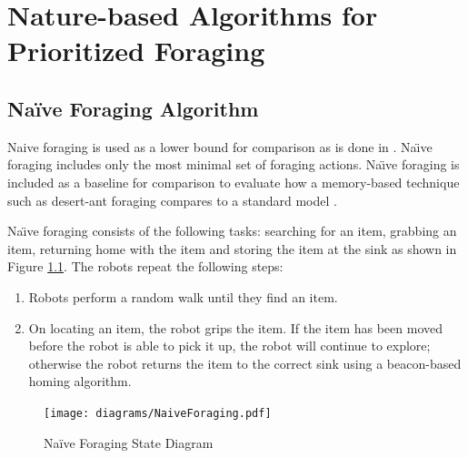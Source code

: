 
\chapter{Nature-based Algorithms for Prioritized Foraging}
\label{chap:third}




\section{Na\"ive Foraging Algorithm}


Naive foraging is used as a lower bound for comparison as is done in \cite{62} \cite{63}. Na\"\i ve foraging includes only the most minimal set of foraging actions. Na\"\i ve foraging is included as a baseline for comparison to evaluate how a memory-based technique such as desert-ant foraging compares to a standard model \cite{ostergaard2001emergent,hoff2010two}.

 Na\"\i ve foraging consists of the following tasks: searching for an item, grabbing an item, returning home with the item and storing the item at the sink as shown in Figure \ref{naiveforagestate}. The robots repeat the following steps: 

\begin{enumerate}
	\item Robots perform a random walk until they find an item.
	\item On locating an item, the robot grips the item. If the item has been moved before the robot is able to pick it up, the robot will continue to explore; otherwise the robot returns the item to the correct sink using a beacon-based homing algorithm.
\end{enumerate}
\begin{figure}
	\centering
	\texttt{[image: diagrams/NaiveForaging.pdf]}
	\caption{Na\"ive Foraging State Diagram}
	\label{naiveforagestate}
\end{figure}

